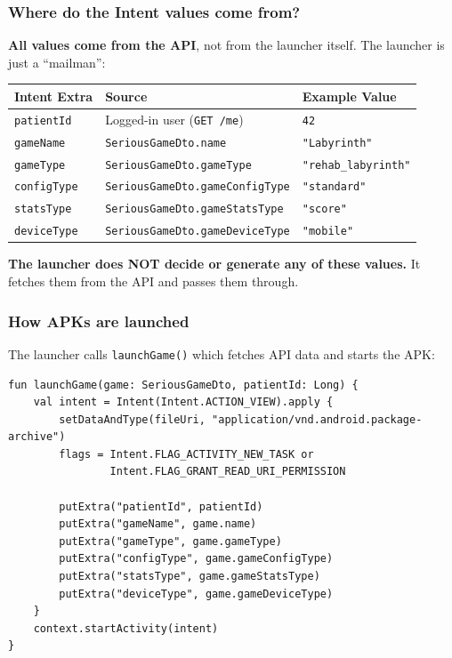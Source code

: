 \subsubsection{Where do the Intent values come
from?}\label{where-do-the-intent-values-come-from}

\textbf{All values come from the API}, not from the launcher itself. The
launcher is just a ``mailman'':

\begin{longtable}[]{@{}lll@{}}
\toprule\noalign{}
Intent Extra & Source & Example Value \\
\midrule\noalign{}
\endhead
\bottomrule\noalign{}
\endlastfoot
\texttt{patientId} & Logged-in user (\texttt{GET\ /me}) & \texttt{42} \\
\texttt{gameName} & \texttt{SeriousGameDto.name} &
\texttt{"Labyrinth"} \\
\texttt{gameType} & \texttt{SeriousGameDto.gameType} &
\texttt{"rehab\_labyrinth"} \\
\texttt{configType} & \texttt{SeriousGameDto.gameConfigType} &
\texttt{"standard"} \\
\texttt{statsType} & \texttt{SeriousGameDto.gameStatsType} &
\texttt{"score"} \\
\texttt{deviceType} & \texttt{SeriousGameDto.gameDeviceType} &
\texttt{"mobile"} \\
\end{longtable}

\textbf{The launcher does NOT decide or generate any of these values.}
It fetches them from the API and passes them through.

\subsubsection{How APKs are launched}\label{how-apks-are-launched}

The launcher calls \texttt{launchGame()} which fetches API data and
starts the APK:

\begin{lstlisting}
fun launchGame(game: SeriousGameDto, patientId: Long) {
    val intent = Intent(Intent.ACTION_VIEW).apply {
        setDataAndType(fileUri, "application/vnd.android.package-archive")
        flags = Intent.FLAG_ACTIVITY_NEW_TASK or
                Intent.FLAG_GRANT_READ_URI_PERMISSION

        putExtra("patientId", patientId)
        putExtra("gameName", game.name)
        putExtra("gameType", game.gameType)
        putExtra("configType", game.gameConfigType)
        putExtra("statsType", game.gameStatsType)
        putExtra("deviceType", game.gameDeviceType)
    }
    context.startActivity(intent)
}
\end{lstlisting}

